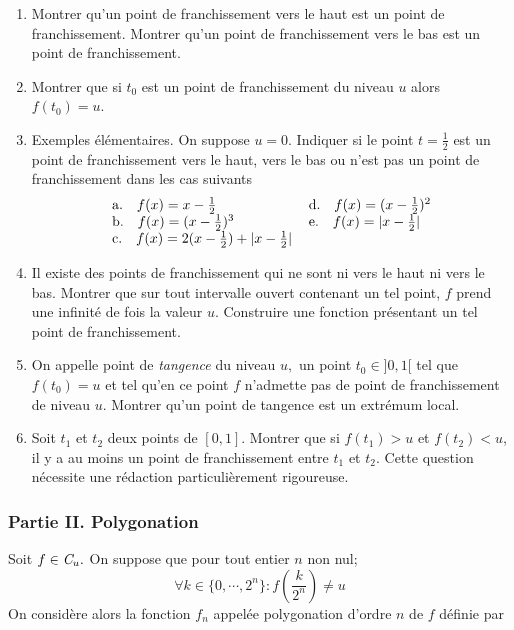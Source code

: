 \begin{enumerate}
\item  Montrer qu'un point de franchissement vers le haut est un point de
franchissement. Montrer qu'un point de franchissement vers le bas est un
point de franchissement.

\item  Montrer que si $t_{0}$ est un point de franchissement du niveau $u$
alors $f(t_{0})=u$.

\item  Exemples {\'e}l{\'e}mentaires. On suppose $u=0$. Indiquer si le point
$t=\frac{1}{2}$ est un point de franchissement vers le haut, vers le bas ou
n'est pas un point de franchissement dans les cas suivants
\[
\begin{tabular}{ll}
a.\quad $f(x)=x-\frac{1}{2}$ & d.\quad $f(x)=(x-\frac{1}{2})^{2}$ \\
b.\quad $f(x)=(x-\frac{1}{2})^{3}$ & e.\quad $f(x)=| x-\frac{1}{2}%
| $ \\
c.\quad $f(x)=2(x-\frac{1}{2})+| x-\frac{1}{2}| $ &
\end{tabular}
\]

\item  Il existe des points de franchissement qui ne sont ni vers le haut ni
vers le bas. Montrer que sur tout intervalle ouvert contenant un tel point, $%
f$ prend une infinit{\'e} de fois la valeur $u$. Construire une fonction
pr{\'e}sentant un tel point de franchissement.

\item  On appelle point de \emph{tangence} du niveau $u,$ un point $t_{0}\in
] 0,1[ $ tel que $f(t_{0})=u$ et tel qu'en ce point $f$ n'admette
pas de point de franchissement de niveau $u$. Montrer qu'un point
de tangence est un extr{\'e}mum local.

\item  Soit $t_{1}$ et $t_{2}$ deux points de $[ 0,1] $. Montrer
que si $f(t_{1})>u$ et $f(t_{2})<u$, il y a au moins un point de
franchissement entre $t_{1}$ et $t_{2}$. Cette question n{\'e}cessite une
r{\'e}daction particuli{\`e}rement rigoureuse.
\end{enumerate}

\subsubsection*{Partie II. Polygonation}

Soit $f\in \emph{C}_{u}.$ On suppose que pour tout entier $n$ non nul;
\[
\forall k\in \{ 0,\cdots ,2^{n}\} :f(\frac{k}{2^{n}})\neq u
\]
On consid{\`e}re alors la fonction $f_{n}$ appel{\'e}e
polygonation d'ordre $n$ de $f$ d{\'e}finie par

